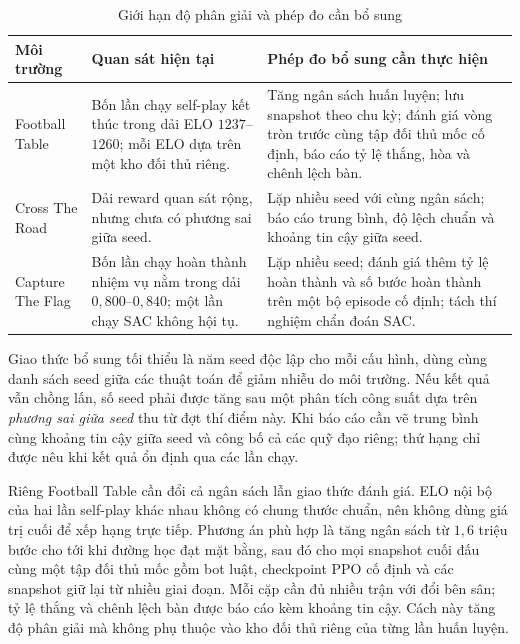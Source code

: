 \begin{table}[H]
\centering
\caption{Giới hạn độ phân giải và phép đo cần bổ sung}
\label{tab:power}
\renewcommand{\arraystretch}{1.35}
\tablefont
\setlength{\tabcolsep}{4pt}
\begin{tabular}{|p{3.2cm}|p{4.7cm}|p{5.8cm}|}
\hline
\textbf{Môi trường} & \textbf{Quan sát hiện tại} & \textbf{Phép đo bổ sung cần thực hiện} \\
\hline
Football Table & Bốn lần chạy self-play kết thúc trong dải ELO $1237$--$1260$; mỗi ELO dựa trên một kho đối thủ riêng. & Tăng ngân sách huấn luyện; lưu snapshot theo chu kỳ; đánh giá vòng tròn trước cùng tập đối thủ mốc cố định, báo cáo tỷ lệ thắng, hòa và chênh lệch bàn. \\
\hline
Cross The Road & Dải reward quan sát rộng, nhưng chưa có phương sai giữa seed. & Lặp nhiều seed với cùng ngân sách; báo cáo trung bình, độ lệch chuẩn và khoảng tin cậy giữa seed. \\
\hline
Capture The Flag & Bốn lần chạy hoàn thành nhiệm vụ nằm trong dải $0{,}800$--$0{,}840$; một lần chạy SAC không hội tụ. & Lặp nhiều seed; đánh giá thêm tỷ lệ hoàn thành và số bước hoàn thành trên một bộ episode cố định; tách thí nghiệm chẩn đoán SAC. \\
\hline
\end{tabular}
\end{table}

\indent Giao thức bổ sung tối thiểu là năm seed độc lập cho mỗi cấu hình, dùng cùng danh
sách seed giữa các thuật toán để giảm nhiễu do môi trường. Nếu kết quả vẫn chồng lấn, số
seed phải được tăng sau một phân tích công suất dựa trên \emph{phương sai giữa seed} thu từ
đợt thí điểm này. Khi báo cáo cần vẽ trung bình cùng khoảng tin cậy giữa seed và công bố cả
các quỹ đạo riêng; thứ hạng chỉ được nêu khi kết quả ổn định qua các lần chạy.

\indent Riêng Football Table cần đổi cả ngân sách lẫn giao thức đánh giá. ELO nội bộ của
hai lần self-play khác nhau không có chung thước chuẩn, nên không dùng giá trị cuối để xếp
hạng trực tiếp. Phương án phù hợp là tăng ngân sách từ $1{,}6$ triệu bước cho tới khi đường
học đạt mặt bằng, sau đó cho mọi snapshot cuối đấu cùng một tập đối thủ mốc gồm bot luật,
checkpoint PPO cố định và các snapshot giữ lại từ nhiều giai đoạn. Mỗi cặp cần đủ nhiều
trận với đổi bên sân; tỷ lệ thắng và chênh lệch bàn được báo cáo kèm khoảng tin cậy. Cách
này tăng độ phân giải mà không phụ thuộc vào kho đối thủ riêng của từng lần huấn luyện.

